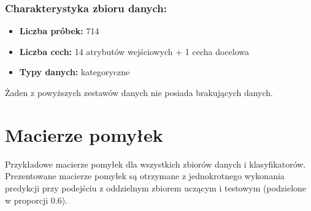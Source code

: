 \documentclass{article}
\begin{document}
\subsubsection*{Charakterystyka zbioru danych:}

\begin{itemize}
    \item \textbf{Liczba próbek:} 714
    \item \textbf{Liczba cech:} 14 atrybutów wejściowych + 1 cecha docelowa
    \item \textbf{Typy danych:} kategoryczne
\end{itemize}

Żaden z powyższych zestawów danych nie posiada brakujących danych.

\section{Macierze pomyłek}
Przykładowe macierze pomyłek dla wszystkich zbiorów danych i klasyfikatorów.
Prezentowane macierze pomyłek są otrzymane z jednokrotnego wykonania predykcji przy podejściu z oddzielnym zbiorem uczącym i testowym (podzielone w proporcji $0.6$).
\end{document}

